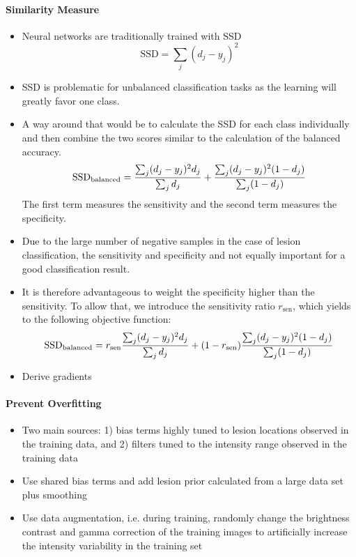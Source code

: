 \paragraph{Similarity Measure}
\begin{itemize}
\item Neural networks are traditionally trained with SSD
\begin{equation} 
\text{SSD} = \sum_j (d_j - y_j)^2 
\end{equation}
\item SSD is problematic for unbalanced classification tasks as the learning will
greatly favor one class.
\item
A way around that would be to calculate the SSD for
each class individually and then combine the two scores similar to the
calculation of the balanced accuracy.
\begin{equation} 
\text{SSD}_\text{balanced} = \frac{\textstyle\sum_j (d_j - y_j)^2 d_j}{%
\textstyle\sum_j d_j} + \frac{\textstyle\sum_j (d_j - y_j)^2 (1 - d_j)}{%
\textstyle\sum_j (1 - d_j)}
\end{equation}
The first term measures the sensitivity and the second term measures the
specificity.
\item Due to the large number of negative samples in the case of lesion
classification, the sensitivity and specificity and not equally important for a
good classification result. 
\item It is therefore advantageous to weight the
specificity higher than the sensitivity. To allow that, we introduce the
sensitivity ratio $r_\text{sen}$, which yields to the following objective
function:
\begin{equation} 
\text{SSD}_\text{balanced} = r_\text{sen}\frac{\textstyle\sum_j (d_j - y_j)^2
d_j}{\textstyle\sum_j d_j} 
+ (1-r_\text{sen})\frac{\textstyle\sum_j (d_j - y_j)^2 (1 - d_j)}{%
\textstyle\sum_j (1 - d_j)}
\end{equation}
\item Derive gradients
\end{itemize}

\paragraph{Prevent Overfitting}
\begin{itemize}
\item Two main sources: 1) bias terms highly tuned to lesion locations observed
in the training data, and 2) filters tuned to the intensity range observed in
the training data
\item Use shared bias terms and add lesion prior calculated from a large data
set plus smoothing
\item Use data augmentation, i.e. during training, randomly change the
brightness contrast and gamma correction of the training images to artificially
increase the intensity variability in the training set
\end{itemize}

